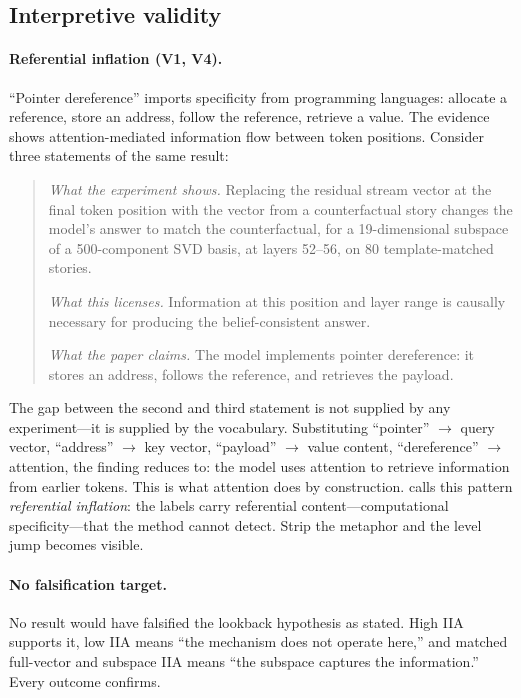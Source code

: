 \documentclass{article}
\begin{document}
\subsection{Interpretive validity}

\paragraph{Referential inflation (V1, V4).}
``Pointer dereference'' imports specificity from programming languages: allocate a reference, store an address, follow the reference, retrieve a value. The evidence shows attention-mediated information flow between token positions. Consider three statements of the same result:

\begin{quote}
\emph{What the experiment shows.} Replacing the residual stream vector at the final token position with the vector from a counterfactual story changes the model's answer to match the counterfactual, for a 19-dimensional subspace of a 500-component SVD basis, at layers 52--56, on 80 template-matched stories.

\emph{What this licenses.} Information at this position and layer range is causally necessary for producing the belief-consistent answer.

\emph{What the paper claims.} The model implements pointer dereference: it stores an address, follows the reference, and retrieves the payload.
\end{quote}

The gap between the second and third statement is not supplied by any experiment---it is supplied by the vocabulary. Substituting ``pointer'' $\rightarrow$ query vector, ``address'' $\rightarrow$ key vector, ``payload'' $\rightarrow$ value content, ``dereference'' $\rightarrow$ attention, the finding reduces to: the model uses attention to retrieve information from earlier tokens. This is what attention does by construction. \citet{tower2026mechref} calls this pattern \emph{referential inflation}: the labels carry referential content---computational specificity---that the method cannot detect. Strip the metaphor and the level jump becomes visible.

\paragraph{No falsification target.}
No result would have falsified the lookback hypothesis as stated. High IIA supports it, low IIA means ``the mechanism does not operate here,'' and matched full-vector and subspace IIA means ``the subspace captures the information.'' Every outcome confirms.
\end{document}
